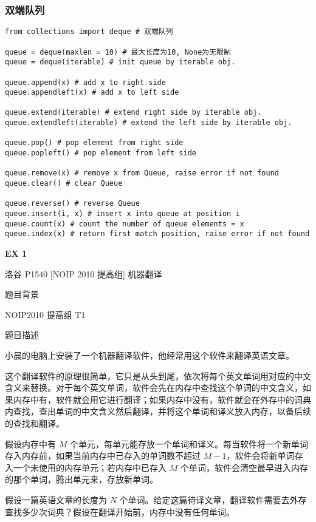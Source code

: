 \documentclass[../main]{subfiles}
\begin{document}
\subsubsection{双端队列}

\begin{lstlisting}[style = Python]
from collections import deque # 双端队列

queue = deque(maxlen = 10) # 最大长度为10, None为无限制
queue = deque(iterable) # init queue by iterable obj.

queue.append(x) # add x to right side
queue.appendleft(x) # add x to left side

queue.extend(iterable) # extend right side by iterable obj.
queue.extendleft(iterable) # extend the left side by iterable obj.

queue.pop() # pop element from right side 
queue.popleft() # pop element from left side

queue.remove(x) # remove x from Queue, raise error if not found
queue.clear() # clear Queue

queue.reverse() # reverse Queue
queue.insert(i, x) # insert x into queue at position i
queue.count(x) # count the number of queue elements = x
queue.index(x) # return first match position, raise error if not found

\end{lstlisting}

\textbf{EX 1}

洛谷 P1540 [NOIP 2010 提高组] 机器翻译

题目背景

NOIP2010 提高组 T1

题目描述

小晨的电脑上安装了一个机器翻译软件，他经常用这个软件来翻译英语文章。

这个翻译软件的原理很简单，它只是从头到尾，依次将每个英文单词用对应的中文含义来替换。对于每个英文单词，软件会先在内存中查找这个单词的中文含义，如果内存中有，软件就会用它进行翻译；如果内存中没有，软件就会在外存中的词典内查找，查出单词的中文含义然后翻译，并将这个单词和译义放入内存，以备后续的查找和翻译。

假设内存中有 $M$ 个单元，每单元能存放一个单词和译义。每当软件将一个新单词存入内存前，如果当前内存中已存入的单词数不超过 $M-1$，软件会将新单词存入一个未使用的内存单元；若内存中已存入 $M$ 个单词，软件会清空最早进入内存的那个单词，腾出单元来，存放新单词。

假设一篇英语文章的长度为 $N$ 个单词。给定这篇待译文章，翻译软件需要去外存查找多少次词典？假设在翻译开始前，内存中没有任何单词。
\end{document}
